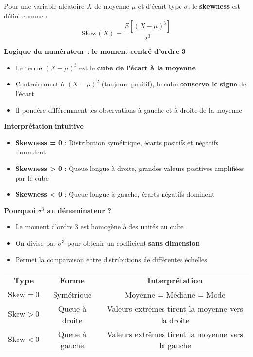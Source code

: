 \begin{intuitionbox}
Pour une variable aléatoire $X$ de moyenne $\mu$ et d'écart-type $\sigma$, le \textbf{skewness} est défini comme :
\[
\text{Skew}(X) = \frac{E[(X - \mu)^3]}{\sigma^3}
\]

\medskip

\textbf{Logique du numérateur : le moment centré d'ordre 3}
\begin{itemize}
    \item Le terme $(X - \mu)^3$ est le \textbf{cube de l'écart à la moyenne}
    \item Contrairement à $(X - \mu)^2$ (toujours positif), le cube \textbf{conserve le signe} de l'écart
    \item Il pondère différemment les observations à gauche et à droite de la moyenne
\end{itemize}

\medskip

\textbf{Interprétation intuitive}
\begin{itemize}
    \item \textbf{Skewness = 0} : Distribution symétrique, écarts positifs et négatifs s'annulent
    \item \textbf{Skewness > 0} : Queue longue à droite, grandes valeurs positives amplifiées par le cube
    \item \textbf{Skewness < 0} : Queue longue à gauche, écarts négatifs dominent
\end{itemize}

\medskip

\textbf{Pourquoi $\sigma^3$ au dénominateur ?}
\begin{itemize}
    \item Le moment d'ordre 3 est homogène à des unités au cube
    \item On divise par $\sigma^3$ pour obtenir un coefficient \textbf{sans dimension}
    \item Permet la comparaison entre distributions de différentes échelles
\end{itemize}

\begin{center}
\begin{tabular}{|c|c|c|}
\hline
\textbf{Type} & \textbf{Forme} & \textbf{Interprétation} \\
\hline
$\text{Skew} = 0$ & Symétrique & Moyenne = Médiane = Mode \\
\hline
$\text{Skew} > 0$ & Queue à droite & Valeurs extrêmes tirent la moyenne vers la droite \\
\hline
$\text{Skew} < 0$ & Queue à gauche & Valeurs extrêmes tirent la moyenne vers la gauche \\
\hline
\end{tabular}
\end{center}
\end{intuitionbox}

